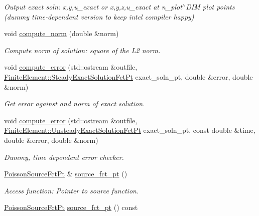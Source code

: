 \begin{DoxyCompactItemize}
\begin{DoxyCompactList}\small\item\em Output exact soln\+: x,y,u\+\_\+exact or x,y,z,u\+\_\+exact at n\+\_\+plot$^\wedge$\+D\+IM plot points (dummy time-\/dependent version to keep intel compiler happy) \end{DoxyCompactList}\item 
void \hyperlink{classoomph_1_1PoissonEquations_a44cc8368f1e4008997908134300ab13f}{compute\+\_\+norm} (double \&norm)
\begin{DoxyCompactList}\small\item\em Compute norm of solution\+: square of the L2 norm. \end{DoxyCompactList}\item 
void \hyperlink{classoomph_1_1PoissonEquations_aa80d68fe086a9adba93ac67afa1bb2f7}{compute\+\_\+error} (std\+::ostream \&outfile, \hyperlink{classoomph_1_1FiniteElement_a690fd33af26cc3e84f39bba6d5a85202}{Finite\+Element\+::\+Steady\+Exact\+Solution\+Fct\+Pt} exact\+\_\+soln\+\_\+pt, double \&error, double \&norm)
\begin{DoxyCompactList}\small\item\em Get error against and norm of exact solution. \end{DoxyCompactList}\item 
void \hyperlink{classoomph_1_1PoissonEquations_a529901bcc5464c599fb0155619e56ed2}{compute\+\_\+error} (std\+::ostream \&outfile, \hyperlink{classoomph_1_1FiniteElement_ad4ecf2b61b158a4b4d351a60d23c633e}{Finite\+Element\+::\+Unsteady\+Exact\+Solution\+Fct\+Pt} exact\+\_\+soln\+\_\+pt, const double \&time, double \&error, double \&norm)
\begin{DoxyCompactList}\small\item\em Dummy, time dependent error checker. \end{DoxyCompactList}\item 
\hyperlink{classoomph_1_1PoissonEquations_a1e3a857c1f506c99d437fb932a24c828}{Poisson\+Source\+Fct\+Pt} \& \hyperlink{classoomph_1_1PoissonEquations_aeeffc9c64ab0be478d2fe1d6e9d0f959}{source\+\_\+fct\+\_\+pt} ()
\begin{DoxyCompactList}\small\item\em Access function\+: Pointer to source function. \end{DoxyCompactList}\item 
\hyperlink{classoomph_1_1PoissonEquations_a1e3a857c1f506c99d437fb932a24c828}{Poisson\+Source\+Fct\+Pt} \hyperlink{classoomph_1_1PoissonEquations_a3b726ee15516f4cf86d2aea3e153c20b}{source\+\_\+fct\+\_\+pt} () const

\end{DoxyCompactItemize}
